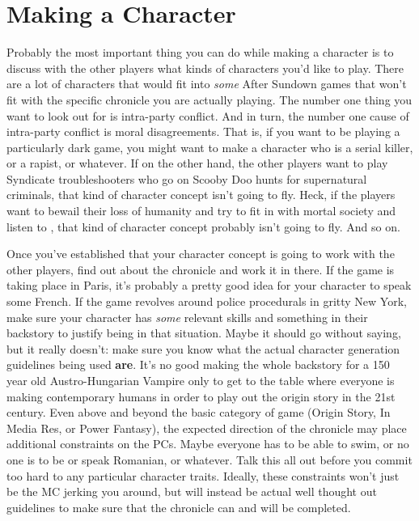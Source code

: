 \section{Making a Character} 

\hspace{\parindent} Probably the most important thing you can do while making a character is to discuss with the other players what kinds of characters you'd like to play. There are a lot of characters that would fit into \textit{some} After Sundown games that won't fit with the specific chronicle you are actually playing. The number one thing you want to look out for is intra-party conflict. And in turn, the number one cause of intra-party conflict is moral disagreements. That is, if you want to be playing a particularly dark game, you might want to make a character who is a serial killer, or a rapist, or whatever. If on the other hand, the other players want to play Syndicate troubleshooters who go on Scooby Doo hunts for supernatural criminals, that kind of character concept isn't going to fly. Heck, if the players want to bewail their loss of humanity and try to fit in with mortal society and listen to , that kind of character concept probably isn't going to fly. And so on.

Once you've established that your character concept is going to work with the other players, find out about the chronicle and work it in there. If the game is taking place in Paris, it's probably a pretty good idea for your character to speak some French. If the game revolves around police procedurals in gritty New York, make sure your character has \textit{some} relevant skills and something in their backstory to justify being in that situation. Maybe it should go without saying, but it really doesn't: make sure you know what the actual character generation guidelines being used \textbf{are}. It's no good making the whole backstory for a 150 year old Austro-Hungarian Vampire only to get to the table where everyone is making contemporary humans in order to play out the origin story in the 21st century. Even above and beyond the basic category of game (Origin Story, In Media Res, or Power Fantasy), the expected direction of the chronicle may place additional constraints on the PCs. Maybe everyone has to be able to swim, or no one is to be or speak Romanian, or whatever. Talk this all out before you commit too hard to any particular character traits. Ideally, these constraints won't just be the MC jerking you around, but will instead be actual well thought out guidelines to make sure that the chronicle can and will be completed.

